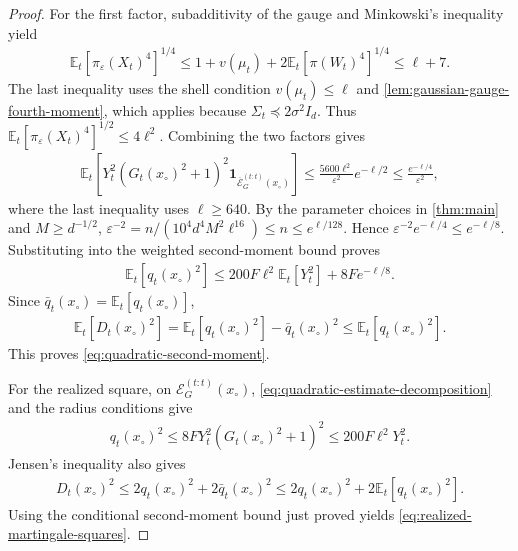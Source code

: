 \documentclass{article}
\newcommand{\E}{\mathbb E}
\newcommand{\1}{\mathbf 1}
\newcommand{\eps}{\varepsilon}
\begin{document}
\begin{proof}
    For the first factor, subadditivity of the gauge and Minkowski's
    inequality yield
    \begin{align}
        \E_t[\pi_\eps(X_t)^4]^{1/4}
        \leq1+v(\mu_t)+2\E_t[\pi(W_t)^4]^{1/4}
        \leq\ell+7.
    \end{align}
    The last inequality uses the shell condition $v(\mu_t)\leq\ell$
    and \cref{lem:gaussian-gauge-fourth-moment}, which applies because
    $\Sigma_t\preceq2\sigma^2I_d$.
    Thus $\E_t[\pi_\eps(X_t)^4]^{1/2}\leq4\ell^2$.
    Combining the two factors gives
    \begin{align}
        \E_t\left[Y_t^2(G_t(x_{\circ})^2+1)^2
        \1_{\overline{\mathcal E}_G^{(t:t)}(x_{\circ})}\right]
        \leq\frac{5600\ell^2}{\eps^2}e^{-\ell/2}
        \leq\frac{e^{-\ell/4}}{\eps^2},
    \end{align}
    where the last inequality uses $\ell\geq640$.
    By the parameter choices in \cref{thm:main} and $M\geq d^{-1/2}$,
    $\eps^{-2}=n/(10^4d^4M^2\ell^{16})\leq n\leq e^{\ell/128}$.
    Hence $\eps^{-2}e^{-\ell/4}\leq e^{-\ell/8}$.
    Substituting into the weighted second-moment bound proves
    \begin{align}
        \E_t[q_t(x_{\circ})^2]
        \leq200F\ell^2\E_t[Y_t^2]
        +8Fe^{-\ell/8}.
    \end{align}
    Since $\bar{q}_t(x_{\circ})=\E_t[q_t(x_{\circ})]$,
    \begin{align}
        \E_t[D_t(x_{\circ})^2]
        =\E_t[q_t(x_{\circ})^2]-\bar{q}_t(x_{\circ})^2
        \leq\E_t[q_t(x_{\circ})^2].
    \end{align}
    This proves \eqref{eq:quadratic-second-moment}.

    For the realized square, on $\mathcal E_G^{(t:t)}(x_{\circ})$,
    \eqref{eq:quadratic-estimate-decomposition} and the radius conditions give
    \begin{align}
        q_t(x_{\circ})^2
        \leq8FY_t^2(G_t(x_{\circ})^2+1)^2
        \leq200F\ell^2Y_t^2.
        \label{eq:realized-quadratic-squares}
    \end{align}
    Jensen's inequality also gives
    \begin{align}
        D_t(x_{\circ})^2
        \leq2q_t(x_{\circ})^2+2\bar{q}_t(x_{\circ})^2
        \leq2q_t(x_{\circ})^2+2\E_t[q_t(x_{\circ})^2].
    \end{align}
    Using the conditional second-moment bound just proved yields
    \eqref{eq:realized-martingale-squares}.
\end{proof}
\end{document}
